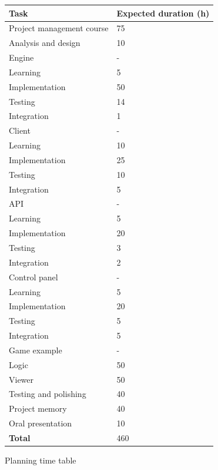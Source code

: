 \documentclass[a4paper,11pt,titlepage,abstract,numbers=noenddot,automark,mnsy,intlimits,rgb,dvipsnames]{report}
\begin{document}
\begin{figure}[H]
\begin{center}
\begin{tabular}{l | l}
\textbf{Task} & \textbf{Expected duration (h)}\\
\hline
Project management course & 75\\
\hline
Analysis and design & 10\\
\hline
Engine & -\\
\hspace{1em}
Learning & 5\\
\hspace{1em}
Implementation & 50\\
\hspace{1em}
Testing & 14\\
\hspace{1em}
Integration & 1\\
\hline
Client & -\\
\hspace{1em}
Learning & 10\\
\hspace{1em}
Implementation & 25\\
\hspace{1em}
Testing & 10\\
\hspace{1em}
Integration & 5\\
\hline
API & -\\
\hspace{1em}
Learning & 5\\
\hspace{1em}
Implementation & 20\\
\hspace{1em}
Testing & 3\\
\hspace{1em}
Integration & 2\\
\hline
Control panel & -\\
\hspace{1em}
Learning & 5\\
\hspace{1em}
Implementation & 20\\
\hspace{1em}
Testing & 5\\
\hspace{1em}
Integration & 5\\
\hline
Game example & -\\
\hspace{1em}
Logic & 50\\
\hspace{1em}
Viewer & 50\\
\hline
Testing and polishing & 40\\
\hline
Project memory & 40\\
\hline
Oral presentation & 10\\
\hline
\hline
\textbf{Total} & 460\\
\end{tabular}
\end{center}
\caption{Planning time table}
\label{planning_time_table}
\end{figure}
\end{document}
